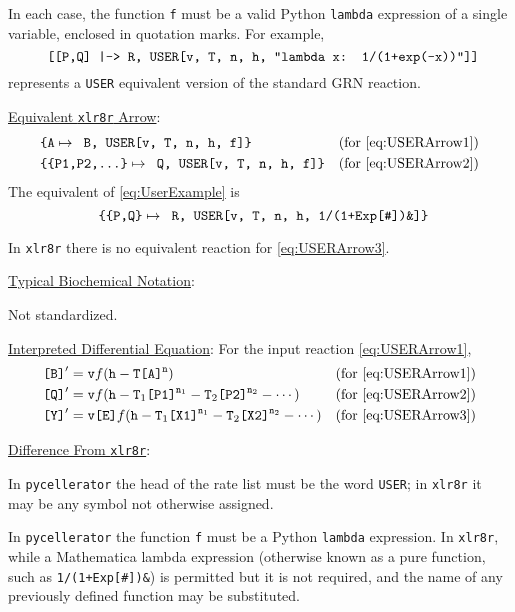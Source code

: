 In each case, the function {\tt f} must be a valid Python {\tt lambda} expression of a single variable, enclosed in quotation marks. For example, 
\begin{equation}
\text{\tt{ [[P,Q] |-> R, USER[v, T, n, h, "lambda x: 1/(1+exp(-x))"]]}}\label{eq:UserExample}
\end{equation}
represents a {\tt USER} equivalent version of the standard GRN reaction. 


\underline{Equivalent {\tt xlr8r} Arrow}: 
\begin{align*}
& \text{\tt{\{A}} \mapsto \text{\tt{ B, USER[v, T, n, h, f]\}}}            &\text{(for \eqref{eq:USERArrow1})}\\
& \text{\tt{\{\{P1,P2,...\}}} \mapsto \text{\tt{  Q, USER[v, T, n, h, f]\}}} &\text{(for \eqref{eq:USERArrow2})}
\end{align*}
The equivalent of \eqref{eq:UserExample} is 
\begin{equation*}
\text{\tt{ \{\{P,Q\}}} \mapsto \text{\tt{ R, USER[v, T, n, h, 1/(1+Exp[\#])\&]\}}}
\end{equation*}

In {\tt xlr8r} there is no equivalent reaction for \eqref{eq:USERArrow3}. 

\underline{Typical Biochemical Notation}: 

Not standardized.

\underline{Interpreted Differential Equation}:
For the input reaction \eqref{eq:USERArrow1}, 
\begin{align*}
&\text{\tt{[B]}}' = \text{\tt{v}} f(\text{\tt{h}}-\text{\tt{T}} \text{\tt{[A]}}^{\text{\tt{n}}}) &\text{(for \eqref{eq:USERArrow1})}\\
&\text{\tt{[Q]}}' = \text{\tt{v}} f(\text{\tt{h}}-\text{\tt{T}}_1 \text{\tt{[P1]}}^{\text{\tt{n}}_1}-\text{\tt{T}}_2 \text{\tt{[P2]}}^{\text{\tt{n}}_2}-\cdots) &\text{(for \eqref{eq:USERArrow2})}\\
&\text{\tt{[Y]}}' = \text{\tt{v[E]}} f(\text{\tt{h}}-\text{\tt{T}}_1 \text{\tt{[X1]}}^{\text{\tt{n}}_1}-\text{\tt{T}}_2 \text{\tt{[X2]}}^{\text{\tt{n}}_2}-\cdots) &\text{(for \eqref{eq:USERArrow3})}
\end{align*}

\underline{Difference From {\tt xlr8r}}:

In {\tt pycellerator} the head of the rate list must be the word {\tt USER}; in {\tt xlr8r} it may be any symbol not otherwise assigned.

In {\tt pycellerator} the function {\tt f} must be a Python {\tt lambda} expression. In {\tt xlr8r}, while a Mathematica lambda expression (otherwise known as a pure function, such as \verb.1/(1+Exp[#])&.) is permitted but it is not required, and the name of any previously defined function may be substituted. 

